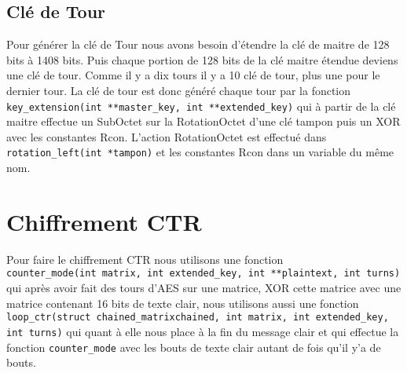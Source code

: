 \documentclass[french, 12pt]{article}
\begin{document}
	\subsection{Clé de Tour}
	Pour générer la clé de Tour nous avons besoin d'étendre la clé de maitre de 128 bits à 1408 bits. Puis chaque portion de 128 bits de la clé maitre étendue deviens une clé de tour. Comme il y a dix tours il y a 10 clé de tour, plus une pour le dernier tour. La clé de tour est donc généré chaque tour par la fonction \verb|key_extension(int **master_key, int **extended_key)| qui à partir de la clé maitre effectue un SubOctet sur la RotationOctet d'une clé tampon puis un XOR avec les constantes Rcon. L'action RotationOctet est effectué dans \verb|rotation_left(int *tampon)| et les constantes Rcon dans un variable du même nom.
	
	\section{Chiffrement CTR}
	
	Pour faire le chiffrement CTR nous utilisons une fonction\\ \verb|counter_mode(int matrix, int extended_key, int **plaintext, int turns)| qui après avoir fait des tours d'AES sur une matrice, XOR cette matrice avec une matrice contenant 16 bits de texte clair, nous utilisons aussi une fonction \verb| loop_ctr(struct chained_matrixchained, int matrix, int extended_key,| \verb|int turns)| qui quant à elle nous place à la fin du message clair et qui effectue la fonction \verb|counter_mode| avec les bouts de texte clair autant de fois qu'il y'a de bouts.
\end{document}
